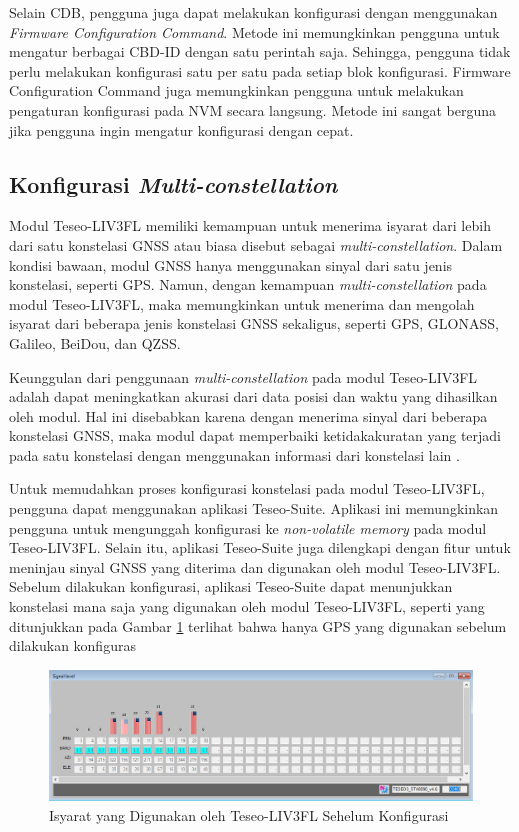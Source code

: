 Selain CDB, pengguna juga dapat melakukan konfigurasi dengan menggunakan \textit{Firmware Configuration Command}. Metode ini memungkinkan pengguna untuk mengatur berbagai CBD-ID dengan satu perintah saja. Sehingga, pengguna tidak perlu melakukan konfigurasi satu per satu pada setiap blok konfigurasi. Firmware Configuration Command juga memungkinkan pengguna untuk melakukan pengaturan konfigurasi pada NVM secara langsung. Metode ini sangat berguna jika pengguna ingin mengatur konfigurasi dengan cepat.

\subsection{Konfigurasi \textit{Multi-constellation}}
Modul Teseo-LIV3FL memiliki kemampuan untuk menerima isyarat dari lebih dari satu konstelasi GNSS atau biasa disebut sebagai \textit{multi-constellation}. Dalam kondisi bawaan, modul GNSS hanya menggunakan sinyal dari satu jenis konstelasi, seperti GPS. Namun, dengan kemampuan \textit{multi-constellation} pada modul Teseo-LIV3FL, maka memungkinkan untuk menerima dan mengolah isyarat dari beberapa jenis konstelasi GNSS sekaligus, seperti GPS, GLONASS, Galileo, BeiDou, dan QZSS.
 
Keunggulan dari penggunaan \textit{multi-constellation} pada modul Teseo-LIV3FL adalah dapat meningkatkan akurasi dari data posisi dan waktu yang dihasilkan oleh modul. Hal ini disebabkan karena dengan menerima sinyal dari beberapa konstelasi GNSS, maka modul dapat memperbaiki ketidakakuratan yang terjadi pada satu konstelasi dengan menggunakan informasi dari konstelasi lain \cite{An2020}.
 
 Untuk memudahkan proses konfigurasi konstelasi pada modul Teseo-LIV3FL, pengguna dapat menggunakan aplikasi Teseo-Suite. Aplikasi ini memungkinkan pengguna untuk mengunggah konfigurasi ke \textit{non-volatile memory} pada modul Teseo-LIV3FL. Selain itu, aplikasi Teseo-Suite juga dilengkapi dengan fitur untuk meninjau sinyal GNSS yang diterima dan digunakan oleh modul Teseo-LIV3FL. Sebelum dilakukan konfigurasi, aplikasi Teseo-Suite dapat menunjukkan konstelasi mana saja yang digunakan oleh modul Teseo-LIV3FL, seperti yang ditunjukkan pada Gambar \ref{Fig: sebelum-konfigurasi} terlihat bahwa hanya GPS yang digunakan sebelum dilakukan konfiguras
 
 \begin{figure}[H]
 	\centering
 	\includegraphics[width=14cm]{contents/chapter-3/setting-konstelasi/sebelum-konfigurasi.png}
 	\caption{Isyarat yang Digunakan oleh Teseo-LIV3FL Sehelum Konfigurasi}
 	\label{Fig: sebelum-konfigurasi}
 \end{figure}
 
